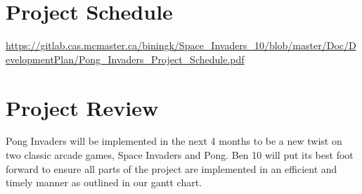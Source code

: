 \documentclass{article}
\begin{document}
\section{Project Schedule}
\url {https://gitlab.cas.mcmaster.ca/biningk/Space_Invaders_10/blob/master/Doc/DevelopmentPlan/Pong_Invaders_Project_Schedule.pdf}
\section{Project Review}
\indent Pong Invaders will be implemented in the next 4 months to be a new twist on two classic arcade games, Space Invaders and Pong. Ben 10 will put its best foot forward to ensure all parts of the project are implemented in an efficient and timely manner as outlined in our gantt chart. 
\newpage
\end{document}
